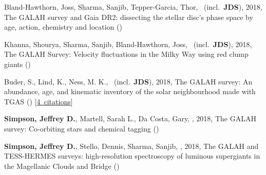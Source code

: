 \item[{\color{numcolor}\scriptsize5}] Bland-Hawthorn, Joss, Sharma, Sanjib, Tepper-Garcia, Thor, \etal\ (incl.\ \textbf{JDS}), 2018, The GALAH survey and Gaia DR2: dissecting the stellar disc's phase space by age, action, chemistry and location ()

\item[{\color{numcolor}\scriptsize4}] Khanna, Shourya, Sharma, Sanjib, Bland-Hawthorn, Joss, \etal\ (incl.\ \textbf{JDS}), 2018, The GALAH Survey: Velocity fluctuations in the Milky Way using red clump giants ()

\item[{\color{numcolor}\scriptsize3}] Buder, S., Lind, K., Ness, M. K., \etal\ (incl.\ \textbf{JDS}), 2018, The GALAH survey: An abundance, age, and kinematic inventory of the solar neighbourhood made with TGAS () [\href{https://ui.adsabs.harvard.edu/#abs/2018arXiv180405869B}{4~citations}]

\item[{\color{numcolor}\scriptsize2}] \textbf{Simpson, Jeffrey D.}, Martell, Sarah L., Da Costa, Gary, \etal, 2018, The GALAH survey: Co-orbiting stars and chemical tagging ()

\item[{\color{numcolor}\scriptsize1}] \textbf{Simpson, Jeffrey D.}, Stello, Dennis, Sharma, Sanjib, \etal, 2018, The GALAH and TESS-HERMES surveys: high-resolution spectroscopy of luminous supergiants in the Magellanic Clouds and Bridge ()
